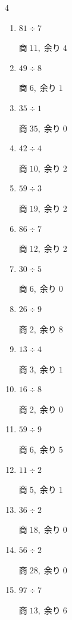 \begin{multicols}{4}
\begin{enumerate}
        $商\; 1,\; 余り\; 2$

  \item $81 \div 7$

        $商\; 11,\; 余り\; 4$

  \item $49 \div 8$

        $商\; 6,\; 余り\; 1$

  \item $35 \div 1$

        $商\; 35,\; 余り\; 0$

  \item $42 \div 4$

        $商\; 10,\; 余り\; 2$

  \item $59 \div 3$

        $商\; 19,\; 余り\; 2$

  \item $86 \div 7$

        $商\; 12,\; 余り\; 2$

  \item $30 \div 5$

        $商\; 6,\; 余り\; 0$

  \item $26 \div 9$

        $商\; 2,\; 余り\; 8$

  \item $13 \div 4$

        $商\; 3,\; 余り\; 1$

  \item $16 \div 8$

        $商\; 2,\; 余り\; 0$

  \item $59 \div 9$

        $商\; 6,\; 余り\; 5$

  \item $11 \div 2$

        $商\; 5,\; 余り\; 1$

  \item $36 \div 2$

        $商\; 18,\; 余り\; 0$

  \item $56 \div 2$

        $商\; 28,\; 余り\; 0$

  \item $97 \div 7$

        $商\; 13,\; 余り\; 6$


\end{enumerate}
\end{multicols}
